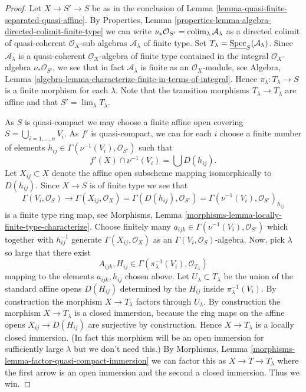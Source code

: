 \begin{proof}
Let $X \to S' \to S$ be as in the conclusion of
Lemma \ref{lemma-quasi-finite-separated-quasi-affine}.
By
Properties, Lemma \ref{properties-lemma-algebra-directed-colimit-finite-type}
we can write
$\nu_*\mathcal{O}_{S'} = \mathop{\rm colim}\nolimits_\lambda \mathcal{A}_\lambda$ as a
directed colimit of quasi-coherent $\mathcal{O}_X$-sub algebras
$\mathcal{A}_\lambda$ of finite type. Set
$T_\lambda = \underline{\mathop{\rm Spec}}_S(\mathcal{A}_\lambda)$.
Since $\mathcal{A}_\lambda$ is a quasi-coherent $\mathcal{O}_X$-algebra
of finite type contained in the integral $\mathcal{O}_X$-algebra
$\nu_*\mathcal{O}_{S'}$, we see that in fact $\mathcal{A}_\lambda$
is finite as an $\mathcal{O}_X$-module, see
Algebra, Lemma \ref{algebra-lemma-characterize-finite-in-terms-of-integral}.
Hence $\pi_\lambda : T_\lambda \to S$ is a finite morphism for each $\lambda$.
Note that the transition morphisms $T_\lambda \to T_{\lambda}$ are affine
and that $S' = \lim_\lambda T_\lambda$.

\medskip\noindent
As $S$ is quasi-compact we may choose a finite
affine open covering $S = \bigcup_{i = 1, \ldots, n} V_i$.
As $f'$ is quasi-compact, we can for each $i$ choose a finite
number of elements $h_{ij} \in \Gamma(\nu^{-1}(V_i), \mathcal{O}_{S'})$
such that
$$
f'(X) \cap \nu^{-1}(V_i) = \bigcup\nolimits D(h_{ij}).
$$
Let $X_{ij} \subset X$ denote the affine open subscheme mapping isomorphically
to $D(h_{ij})$. Since $X \to S$ is of finite type we see that
$$
\Gamma(V_i, \mathcal{O}_S) \to
\Gamma(X_{ij}, \mathcal{O}_X) =
\Gamma(D(h_{ij}), \mathcal{O}_{S'}) =
\Gamma(\nu^{-1}(V_i), \mathcal{O}_{S'})_{h_{ij}}
$$
is a finite type ring map, see
Morphisms, Lemma \ref{morphisms-lemma-locally-finite-type-characterize}.
Choose finitely many $a_{ijk} \in \Gamma(\nu^{-1}(V_i), \mathcal{O}_{S'})$
which together with $h_{ij}^{-1}$ generate $\Gamma(X_{ij}, \mathcal{O}_X)$
as an $\Gamma(V_i, \mathcal{O}_S)$-algebra. Now, pick $\lambda$ so large
that there exist
$$
A_{ijk}, H_{ij} \in \Gamma(\pi_\lambda^{-1}(V_i), \mathcal{O}_{T_\lambda})
$$
mapping to the elements $a_{ijk}, h_{ij}$ chosen above. Let
$U_\lambda \subset T_\lambda$ be the union of the standard affine opens
$D(H_{ij})$ determined by the $H_{ij}$ inside $\pi_\lambda^{-1}(V_i)$.
By construction the morphism $X \to T_\lambda$ factors through
$U_\lambda$. By construction the morphism $X \to T_\lambda$ is a closed
immersion, because the ring maps on the affine opens $X_{ij} \to D(H_{ij})$
are surjective by construction. Hence $X \to T_\lambda$ is a locally closed
immersion. (In fact this morphism will be an open immersion for sufficiently
large $\lambda$ but we don't need this.) By
Morphisms, Lemma \ref{morphisms-lemma-factor-quasi-compact-immersion}
we can factor this as $X \to T \to T_\lambda$ where the first arrow
is an open immersion and the second a closed immersion. Thus we win.
\end{proof}


